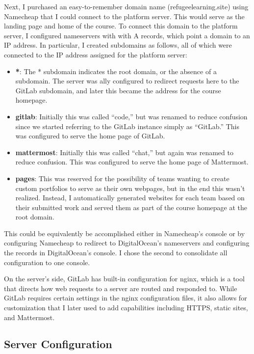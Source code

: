 \documentclass[12pt,twoside]{mitthesis}
\begin{document}
{Next, I purchased an easy-to-remember domain name (refugeelearning.site) using Namecheap that I could connect to the platform server. This would serve as the landing page and home of the course. To connect this domain to the platform server, I configured nameservers with with A records, which point a domain to an IP address. In particular, I created subdomains as follows, all of which were connected to the IP address assigned for the platform server:
\begin{itemize}
\item \textbf{*}: The * subdomain indicates the root domain, or the absence of a subdomain. The server was ally configured to redirect requests here to the GitLab subdomain, and later this became the address for the course homepage.
\item \textbf{gitlab}: Initially this was called ``code,'' but was renamed to reduce confusion since we started referring to the GitLab instance simply as ``GitLab.'' This was configured to serve the home page of GitLab.
\item \textbf{mattermost}: Initially this was called ``chat,'' but again was renamed to reduce confusion. This was configured to serve the home page of Mattermost.
\item \textbf{pages}: This was reserved for the possibility of teams wanting to create custom portfolios to serve as their own webpages, but in the end this wasn't realized. Instead, I automatically generated websites for each team based on their submitted work and served them as part of the course homepage at the root domain.
\end{itemize}
This could be equivalently be accomplished either in Namecheap's console or by configuring Namecheap to redirect to DigitalOcean's nameservers and configuring the records in DigitalOcean's console. I chose the second to consolidate all configuration to one console.

On the server's side, GitLab has built-in configuration for nginx, which is a tool that directs how web requests to a server are routed and responded to. While GitLab requires certain settings in the nginx configuration files, it also allows for customization that I later used to add capabilities including HTTPS, static sites, and Mattermost.}

\subsection{Server Configuration}
\end{document}
